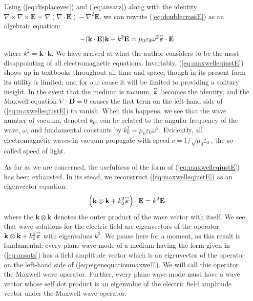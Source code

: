 \documentclass[11pt, reqno]{book}%
\newcounter{ct}
\newcommand{\es}{\begin{equation}}
\newcommand{\ef}{\end{equation} \vspace{0.05in}}
\newcommand{\mbf}{\mathbf}
\newcommand{\mbfg}[1]{\mbf{\mbox{\boldmath$#1$}}}
\newcommand{\ve}{\varepsilon}
\newcommand{\tens}{\overset{\text{\tiny$\leftrightarrow$}}}
\begin{document}
Using (\ref{eq:displacevec}) and (\ref{eq:ansatz}) along with the identity $\nabla\times\nabla\times \mbf{E} = \nabla(\nabla\cdot\mbf{E})-\nabla^2\mbf{E}$, we can rewrite (\ref{eq:doublecrossE}) as an algebraic equation:
\es
 -(\mbf{k}\cdot \mbf{E}) \mbf{k} +k^2 \mbf{E}= \mu_0\ve_0 \omega^2 \tens{\mbfg{\varepsilon}}\cdot \mbf{E}
 \label{eq:maxwelleqjustE}
\ef
\noindent where $k^2 = \mbf{k}\cdot \mbf{k}$. We have arrived at what the author considers to be the most disappointing of all electromagnetic equations. Invariably, (\ref{eq:maxwelleqjustE}) shows up in textbooks throughout all time and space, though in its present form its utility is limited; and for our cause it will be limited to providing a solitary insight. In the event that the medium is vacuum, $\tens{\mbfg{\ve}}$ becomes the identity, and the Maxwell equation $\nabla\cdot \mbf{D} =0$ causes the first term on the left-hand side of (\ref{eq:maxwelleqjustE}) to vanish. When this happens, we see that the wave number of vacuum, denoted $k_0$, can be related to the angular frequency of the wave, $\omega$, and fundamental constants by $k^2_0 = \mu_0 \ve_0 \omega^2$. Evidently, all electromagnetic waves in vacuum propagate with speed $c = 1/\sqrt{\mu_0\ve_0}$, the so-called speed of light.

As far as we are concerned, the usefulness of the form of (\ref{eq:maxwelleqjustE}) has been exhausted. In its stead, we reconstruct (\ref{eq:maxwelleqjustE}) as an eigenvector equation:
\es
\left(\mbf{k}\otimes \mbf{k}+k^2_0 \tens{\mbfg{\ve}}\right)\cdot \mbf{E} = k^2 \mbf{E}
\label{eq:eigenequationmaxwell}
\ef
\noindent where the $\mbf{k}\otimes\mbf{k}$ denotes the outer product of the wave vector with itself. We see that wave solutions for the electric field are eigenvectors of the operator $\mbf{k}\otimes\mbf{k} +k^2_0 \tens{\mbfg{\ve}}$ with eigenvalues $k^2$. We pause here for a moment, as this result is fundamental: every plane wave mode of a medium having the form given in (\ref{eq:ansatz}) has a field amplitude vector which is an eigenvector of the operator on the left-hand side of (\ref{eq:eigenequationmaxwell}). We will call this operator the Maxwell wave operator. Further, every plane wave mode must have a wave vector whose self dot product is an eigenvalue of the electric field amplitude vector under the Maxwell wave operator. 
\end{document}
